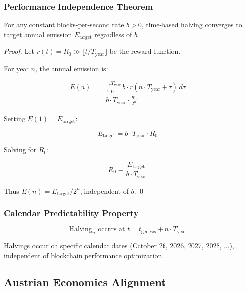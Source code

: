 \documentclass[11pt,a4paper]{article}
\begin{document}
\subsubsection{Performance Independence Theorem}

\begin{theorem}
For any constant blocks-per-second rate $b > 0$, time-based halving converges to target annual emission $E_{\text{target}}$ regardless of $b$.
\end{theorem}

\begin{proof}
Let $r(t) = R_0 \gg \lfloor t / T_{\text{year}} \rfloor$ be the reward function.

For year $n$, the annual emission is:

\begin{align}
E(n) &= \int_0^{T_{\text{year}}} b \cdot r(n \cdot T_{\text{year}} + \tau) \, d\tau \\
     &= b \cdot T_{\text{year}} \cdot \frac{R_0}{2^n}
\end{align}

Setting $E(1) = E_{\text{target}}$:

\begin{equation}
E_{\text{target}} = b \cdot T_{\text{year}} \cdot R_0
\end{equation}

Solving for $R_0$:

\begin{equation}
R_0 = \frac{E_{\text{target}}}{b \cdot T_{\text{year}}}
\end{equation}

Thus $E(n) = E_{\text{target}} / 2^n$, independent of $b$. \qed
\end{proof}

\subsubsection{Calendar Predictability Property}

\begin{equation}
\text{Halving}_n \text{ occurs at } t = t_{\text{genesis}} + n \cdot T_{\text{year}}
\end{equation}

Halvings occur on specific calendar dates (October 26, 2026, 2027, 2028, ...), independent of blockchain performance optimization.

\subsection{Austrian Economics Alignment}
\end{document}
